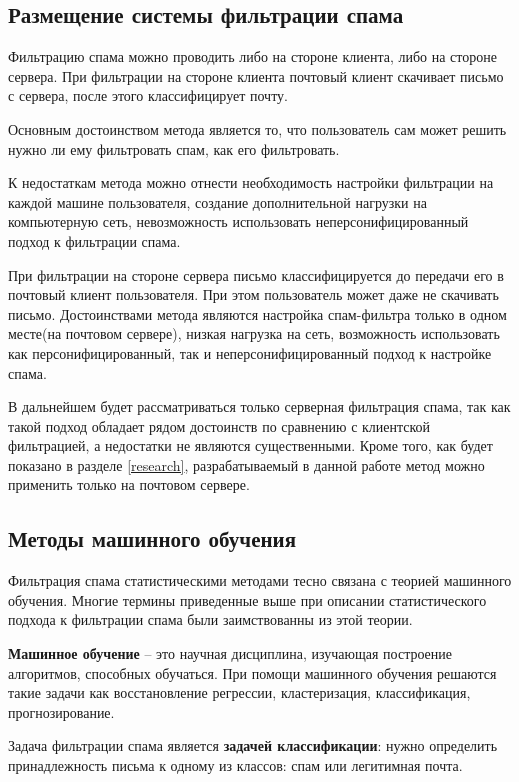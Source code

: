 \subsection{Размещение системы фильтрации  спама}
Фильтрацию спама можно проводить либо на стороне клиента, либо на стороне сервера. 
При фильтрации на стороне клиента почтовый клиент скачивает письмо с сервера, после этого классифицирует почту. 

Основным достоинством метода является то, что пользователь сам может решить нужно ли ему фильтровать спам, как его фильтровать.

К недостаткам метода можно отнести необходимость настройки фильтрации на каждой машине пользователя, создание  дополнительной нагрузки на компьютерную сеть, невозможность использовать неперсонифицированный подход к фильтрации спама.


При фильтрации на стороне сервера письмо классифицируется до передачи его в почтовый клиент пользователя. При этом пользователь может даже не скачивать письмо. Достоинствами метода являются настройка спам-фильтра только в одном месте(на почтовом сервере), низкая нагрузка на сеть, возможность использовать как персонифицированный, так и неперсонифицированный подход к настройке спама.

В дальнейшем будет рассматриваться только серверная фильтрация спама, так как такой подход обладает рядом достоинств по сравнению с клиентской фильтрацией, а недостатки не являются существенными. Кроме того, как будет показано в разделе \ref{research}, разрабатываемый в данной работе метод можно применить только на почтовом сервере.



\subsection{Методы машинного обучения}
\label{MLINTRO}
Фильтрация спама статистическими методами тесно связана с теорией машинного обучения. Многие термины приведенные выше при описании статистического подхода к фильтрации спама были заимствованны из этой теории.


\textbf{Машинное обучение} – это научная дисциплина, изучающая построение алгоритмов, способных обучаться\cite{VORONCOV}. При помощи машинного обучения решаются такие задачи как восстановление регрессии, кластеризация, классификация, прогнозирование.  

Задача фильтрации спама является \textbf{задачей классификации}: нужно определить принадлежность письма к одному из классов: спам или легитимная почта.

